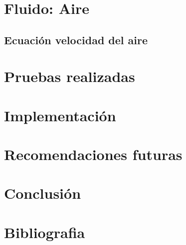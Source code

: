 \documentclass[12pt,a4paper]{article}
\begin{document}
\newpage
	\section{Fluido: Aire}
	\subsection{Ecuación velocidad del aire} \label{sec:ecvel}
	
	\newpage
	
	\newpage
	\section{Pruebas realizadas}
	
	\newpage
	\section{Implementación} 
	
		\newpage
	\section{Recomendaciones futuras}
	
	\newpage
	\section{Conclusión}
	
	

		\newpage
	\section{Bibliografia}


\printbibliography

\newpage

\appendix
\clearpage
\appendixpage


\end{document}
